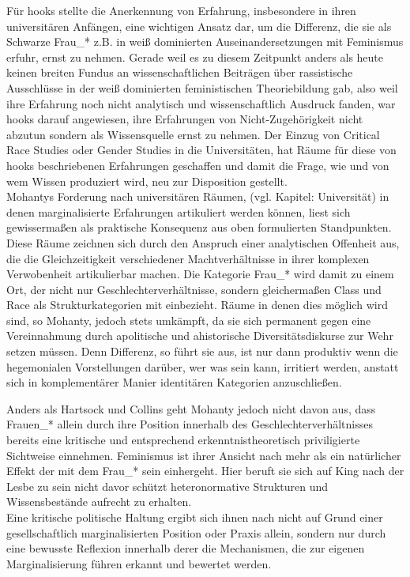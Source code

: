 Für hooks stellte die Anerkennung von Erfahrung, insbesondere in ihren
universitären Anfängen, eine wichtigen Ansatz dar, um die Differenz, die sie
als Schwarze Frau\_* z.B. in weiß dominierten Auseinandersetzungen mit
Feminismus erfuhr, ernst zu nehmen. Gerade weil es zu diesem Zeitpunkt anders
als heute keinen breiten Fundus an wissenschaftlichen Beiträgen über
rassistische Ausschlüsse in der weiß dominierten feministischen Theoriebildung
gab, also weil ihre Erfahrung noch nicht analytisch und wissenschaftlich
Ausdruck fanden, war hooks darauf angewiesen, ihre Erfahrungen von
Nicht-Zugehörigkeit nicht abzutun sondern als Wissensquelle ernst zu
nehmen.\footnotemark {}
Der Einzug von Critical Race Studies oder Gender Studies in die Universitäten,
hat Räume für diese von hooks beschriebenen Erfahrungen geschaffen und damit
die Frage, wie und von wem Wissen produziert wird, neu zur Disposition
gestellt.\footnotemark {} 
\\
Mohantys Forderung nach universitären Räumen, (vgl. Kapitel: Universität)
in denen marginalisierte Erfahrungen artikuliert werden können, liest sich
gewissermaßen als praktische Konsequenz aus oben formulierten Standpunkten.
Diese Räume zeichnen sich durch den Anspruch einer analytischen Offenheit aus,
die die Gleichzeitigkeit verschiedener Machtverhältnisse in ihrer komplexen
Verwobenheit artikulierbar machen. Die Kategorie Frau\_* wird damit zu einem
Ort, der nicht nur Geschlechterverhältnisse, sondern gleichermaßen Class und
Race als Strukturkategorien mit einbezieht. Räume in denen dies möglich wird
sind, so Mohanty, jedoch stets umkämpft, da sie sich permanent gegen eine
Vereinnahmung durch apolitische und ahistorische Diversitätsdiskurse zur Wehr
setzen müssen. Denn Differenz, so führt sie aus, ist nur dann produktiv wenn
die hegemonialen Vorstellungen darüber, wer was sein kann, irritiert werden,
anstatt sich in komplementärer Manier identitären Kategorien
anzuschließen.\footnotemark {} 

Anders als Hartsock und Collins geht Mohanty jedoch nicht davon aus, dass
Frauen\_* allein durch ihre Position innerhalb des Geschlechterverhältnisses
bereits eine kritische und entsprechend erkenntnistheoretisch priviligierte
Sichtweise einnehmen. Feminismus ist ihrer Ansicht nach mehr als ein
natürlicher Effekt der mit dem Frau\_* sein einhergeht. Hier beruft sie sich auf
King nach der Lesbe zu sein nicht davor schützt heteronormative Strukturen und
Wissensbestände aufrecht zu erhalten. \\
Eine kritische politische Haltung ergibt
sich ihnen nach nicht auf Grund einer gesellschaftlich marginalisierten
Position oder Praxis allein, sondern nur durch eine bewusste Reflexion
innerhalb derer die Mechanismen, die zur eigenen Marginalisierung führen
erkannt und bewertet werden.\footnotemark {}

